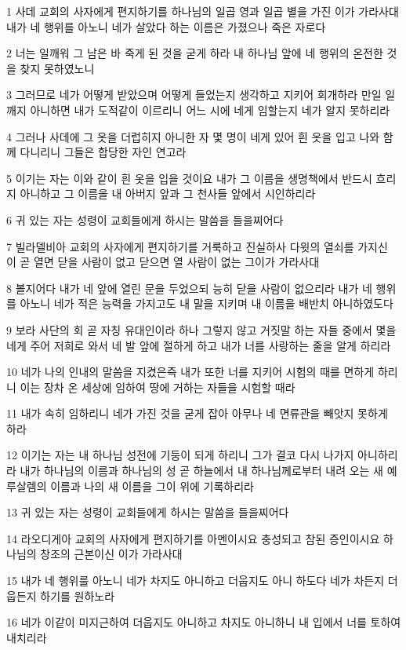 \par 1 사데 교회의 사자에게 편지하기를 하나님의 일곱 영과 일곱 별을 가진 이가 가라사대 내가 네 행위를 아노니 네가 살았다 하는 이름은 가졌으나 죽은 자로다
\par 2 너는 일깨워 그 남은 바 죽게 된 것을 굳게 하라 내 하나님 앞에 네 행위의 온전한 것을 찾지 못하였노니
\par 3 그러므로 네가 어떻게 받았으며 어떻게 들었는지 생각하고 지키어 회개하라 만일 일깨지 아니하면 내가 도적같이 이르리니 어느 시에 네게 임할는지 네가 알지 못하리라
\par 4 그러나 사데에 그 옷을 더럽히지 아니한 자 몇 명이 네게 있어 흰 옷을 입고 나와 함께 다니리니 그들은 합당한 자인 연고라
\par 5 이기는 자는 이와 같이 흰 옷을 입을 것이요 내가 그 이름을 생명책에서 반드시 흐리지 아니하고 그 이름을 내 아버지 앞과 그 천사들 앞에서 시인하리라
\par 6 귀 있는 자는 성령이 교회들에게 하시는 말씀을 들을찌어다
\par 7 빌라델비아 교회의 사자에게 편지하기를 거룩하고 진실하사 다윗의 열쇠를 가지신 이 곧 열면 닫을 사람이 없고 닫으면 열 사람이 없는 그이가 가라사대
\par 8 볼지어다 내가 네 앞에 열린 문을 두었으되 능히 닫을 사람이 없으리라 내가 네 행위를 아노니 네가 적은 능력을 가지고도 내 말을 지키며 내 이름을 배반치 아니하였도다
\par 9 보라 사단의 회 곧 자칭 유대인이라 하나 그렇지 않고 거짓말 하는 자들 중에서 몇을 네게 주어 저희로 와서 네 발 앞에 절하게 하고 내가 너를 사랑하는 줄을 알게 하리라
\par 10 네가 나의 인내의 말씀을 지켰은즉 내가 또한 너를 지키어 시험의 때를 면하게 하리니 이는 장차 온 세상에 임하여 땅에 거하는 자들을 시험할 때라
\par 11 내가 속히 임하리니 네가 가진 것을 굳게 잡아 아무나 네 면류관을 빼앗지 못하게 하라
\par 12 이기는 자는 내 하나님 성전에 기둥이 되게 하리니 그가 결코 다시 나가지 아니하리라 내가 하나님의 이름과 하나님의 성 곧 하늘에서 내 하나님께로부터 내려 오는 새 예루살렘의 이름과 나의 새 이름을 그이 위에 기록하리라
\par 13 귀 있는 자는 성령이 교회들에게 하시는 말씀을 들을찌어다
\par 14 라오디게아 교회의 사자에게 편지하기를 아멘이시요 충성되고 참된 증인이시요 하나님의 창조의 근본이신 이가 가라사대
\par 15 내가 네 행위를 아노니 네가 차지도 아니하고 더웁지도 아니 하도다 네가 차든지 더웁든지 하기를 원하노라
\par 16 네가 이같이 미지근하여 더웁지도 아니하고 차지도 아니하니 내 입에서 너를 토하여 내치리라
